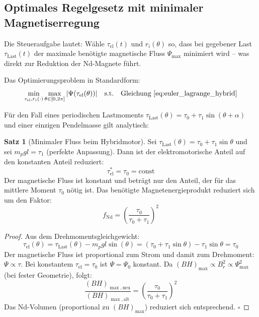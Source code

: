 ﻿\documentclass[12pt, a4paper]{report}
\theoremstyle{definition}
\newtheorem{theorem}{Satz}[section]
\theoremstyle{remark}
\begin{document}
\subsection{Optimales Regelgesetz mit minimaler Magnetiserregung}

Die Steueraufgabe lautet: Wähle $\tau_{\text{el}}(t)$ und $r_i(\theta)$ so, dass
bei gegebener Last $\tau_{\text{Last}}(t)$ der maximale benötigte magnetische Fluss
$\Psi_{\max}$ minimiert wird -- was direkt zur Reduktion der Nd-Magnete führt.

Das Optimierungsproblem in Standardform:
\begin{equation}
  \min_{\tau_{\text{el}}, r_i(\cdot)}
    \max_{\theta \in [0, 2\pi]} |\Psi(\tau_{\text{el}}(\theta))|
  \quad\text{s.t.}\quad \text{Gleichung~\eqref{eq:euler_lagrange_hybrid}}
  \label{eq:optproblem}
\end{equation}

Für den Fall eines periodischen Lastmoments $\tau_{\text{Last}}(\theta) =
\tau_0 + \tau_1\sin(\theta + \alpha)$ und einer einzigen Pendelmasse gilt analytisch:

\begin{theorem}[Minimaler Fluss beim Hybridmotor]
  \label{thm:hybridmotor}
  Sei $\tau_{\text{Last}}(\theta) = \tau_0 + \tau_1\sin\theta$ und sei
  $m_p g l = \tau_1$ (perfekte Anpassung). Dann ist der elektromotorische
  Anteil auf den konstanten Anteil reduziert:
  \begin{equation}
    \tau_{\text{el}}^* = \tau_0 = \text{const}
    \label{eq:tau_el_opt}
  \end{equation}
  Der magnetische Fluss ist konstant und beträgt nur den Anteil, der für
  das mittlere Moment $\tau_0$ nötig ist. Das benötigte Magnetenergieprodukt
  reduziert sich um den Faktor:
  \begin{equation}
    f_{\text{Nd}} = \left(\frac{\tau_0}{\tau_0 + \tau_1}\right)^2
    \label{eq:f_nd}
  \end{equation}
\end{theorem}

\begin{proof}
  Aus dem Drehmomentsgleichgewicht:
  \begin{equation}
    \tau_{\text{el}}(\theta) = \tau_{\text{Last}}(\theta) - m_p g l \sin(\theta)
    = (\tau_0 + \tau_1\sin\theta) - \tau_1\sin\theta = \tau_0
  \end{equation}
  Der magnetische Fluss ist proportional zum Strom und damit zum Drehmoment:
  $\Psi \propto \tau$. Bei konstantem $\tau_{\text{el}} = \tau_0$ ist
  $\Psi = \Psi_0$ konstant. Da $(BH)_{\max} \propto B_r^2 \propto \Psi_{\max}^2$
  (bei fester Geometrie), folgt:
  \begin{equation}
    \frac{(BH)_{\max,\text{neu}}}{(BH)_{\max,\text{alt}}} = \left(\frac{\tau_0}{\tau_0+\tau_1}\right)^2
  \end{equation}
  Das Nd-Volumen (proportional zu $(BH)_{\max}$) reduziert sich entsprechend. $\square$
\end{proof}
\end{document}
